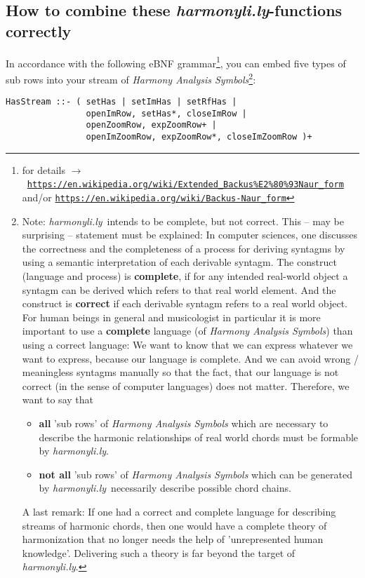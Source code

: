 \documentclass[
  DIV=calc,
  BCOR=5mm,
  12pt,
  headings=small,
  oneside,
  abstract=true,
  toc=bib,
  xcolor=dvipsnames,
  openany,
  ngerman,english]{scrartcl}
\newcommand{\ra}[0]{$\rightarrow$}
\newcommand{\lnka}[1]{\href{#1}{\texttt{#1}}}
\newcommand{\hlyn}[0]{\textit{harmonyli.ly}}
\newcommand{\has}[1]{\textit{Harmony Analysis Symbol#1}}
\begin{document}
\subsection{How to combine these \hlyn-functions correctly}

In accordance with the following eBNF
grammar\footnote{for details \ra\ 
\lnka{https://en.wikipedia.org/wiki/Extended\_Backus\%E2\%80\%93Naur\_form}
and/or \lnka{https://en.wikipedia.org/wiki/Backus-Naur\_form}
}, you can embed five types of sub rows
into your stream of \has{s}\footnote{Note: \hlyn\ intends to be complete, but
not correct. This -- may be surprising -- statement must be explained: In
computer sciences, one discusses the correctness and the completeness of a
process for deriving syntagms by using a semantic interpretation of each
derivable syntagm. The construct (language and process) is \textbf{complete}, if
for any intended real-world object a syntagm can be derived which refers to that
real world element. And the construct is \textbf{correct} if each derivable
syntagm refers to a real world object. For human beings in general and
musicologist in particular it is more important to use a \textbf{complete} 
language (of \has{s}) than using a correct language: We want to know that
we can express whatever we want to express, because our language is complete.
And we can avoid wrong / meaningless syntagms manually so that the fact, that
our language is not correct (in the sense of computer languages) does not
matter. Therefore, we want to say that
\begin{itemize}
  \item \textbf{all} 'sub rows' of \has{s} which are necessary to describe the
  harmonic relationships of real world chords must be formable by \hlyn.
  \item \textbf{not all} 'sub rows' of \has{s} which can be generated by \hlyn\
  necessarily describe possible chord chains.
\end{itemize}
A last remark: If one had a correct and complete language for describing streams
of harmonic chords, then one would have a complete theory of harmonization
that no longer needs the help of 'unrepresented human knowledge'.
Delivering such a theory is far beyond the target of \hlyn.
}:

\begin{verbatim}
HasStream ::- ( setHas | setImHas | setRfHas |
                openImRow, setHas*, closeImRow |
                openZoomRow, expZoomRow+ |
                openImZoomRow, expZoomRow*, closeImZoomRow )+
\end{verbatim}
\end{document}
